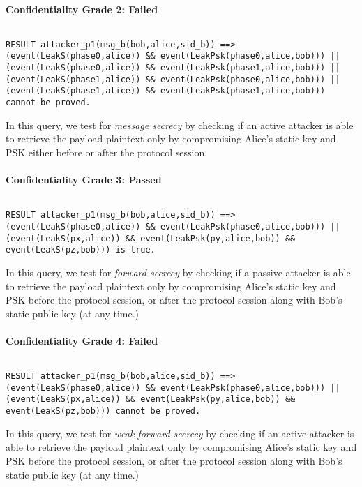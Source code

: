 \paragraph{Confidentiality Grade 2: Failed}$ $
\begin{lstlisting}
RESULT attacker_p1(msg_b(bob,alice,sid_b)) ==> (event(LeakS(phase0,alice)) && event(LeakPsk(phase0,alice,bob))) || (event(LeakS(phase0,alice)) && event(LeakPsk(phase1,alice,bob))) || (event(LeakS(phase1,alice)) && event(LeakPsk(phase0,alice,bob))) || (event(LeakS(phase1,alice)) && event(LeakPsk(phase1,alice,bob))) cannot be proved.
\end{lstlisting}

In this query, we test for \emph{message secrecy} by checking if an active attacker is able to retrieve the payload plaintext only by compromising Alice's static key and PSK either before or after the protocol session.


\paragraph{Confidentiality Grade 3: Passed}$ $
\begin{lstlisting}
RESULT attacker_p1(msg_b(bob,alice,sid_b)) ==> (event(LeakS(phase0,alice)) && event(LeakPsk(phase0,alice,bob))) || (event(LeakS(px,alice)) && event(LeakPsk(py,alice,bob)) && event(LeakS(pz,bob))) is true.
\end{lstlisting}

In this query, we test for \emph{forward secrecy} by checking if a passive attacker is able to retrieve the payload plaintext only by compromising Alice's static key and PSK before the protocol session, or after the protocol session along with Bob's static public key (at any time.)


\paragraph{Confidentiality Grade 4: Failed}$ $
\begin{lstlisting}
RESULT attacker_p1(msg_b(bob,alice,sid_b)) ==> (event(LeakS(phase0,alice)) && event(LeakPsk(phase0,alice,bob))) || (event(LeakS(px,alice)) && event(LeakPsk(py,alice,bob)) && event(LeakS(pz,bob))) cannot be proved.
\end{lstlisting}

In this query, we test for \emph{weak forward secrecy} by checking if an active attacker is able to retrieve the payload plaintext only by compromising Alice's static key and PSK before the protocol session, or after the protocol session along with Bob's static public key (at any time.)


